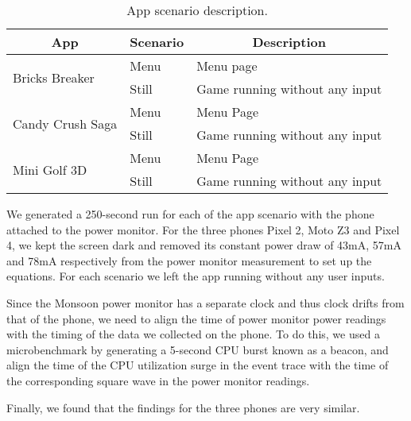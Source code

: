 \begin{table}[tp]
    \centering
    \caption{App scenario description.}
    \vspace{-0.1in}
    {\small
    \begin{tabular}{|p{15mm}|p{12mm}|p{46mm}|}
    \hline
    \multicolumn{1}{|c|}{App} & \multicolumn{1}{c|}{Scenario} & \multicolumn{1}{c|}{Description} \\
    \hline
         \multirow{2}{15mm}{Bricks Breaker} & Menu & Menu page\\
         \cline{2-3}
         & Still & Game running without any input \\
         \hline
         \multirow{2}{15mm}{Candy Crush Saga} & Menu & Menu Page\\
         \cline{2-3}
         & Still &  Game running without any input \\
         \hline
         \multirow{2}{15mm}{Mini Golf 3D} & Menu & Menu Page \\
         \cline{2-3}
         & Still &  Game running without any input \\
        \hline
    \end{tabular}
    }
    \label{tab:app_scenario_description}
    \vspace{-0.1in}
\end{table}

We generated a 250-second run for each of the app scenario with the phone attached to the power monitor.
For
the three phones Pixel 2, Moto Z3 and Pixel 4, we kept the screen dark and removed its constant power draw of 43mA, 57mA and 78mA respectively
from the power monitor measurement to set up the equations. 
For each scenario we left the app running without any user inputs.


Since the Monsoon power monitor has a separate clock and thus clock drifts from that of the phone, we need to align the time of power monitor  power readings with the timing of the data we collected on the phone.
To do this, we used a microbenchmark by generating a 5-second CPU burst known as a beacon,
and align the time of the CPU utilization surge in the event trace with the time of the corresponding square wave in the power monitor readings.


Finally, we found that the findings for the three phones are  very similar.
